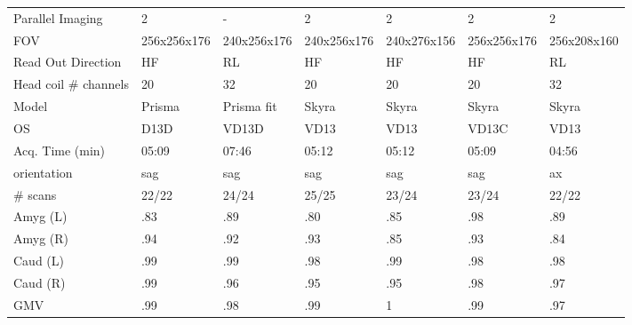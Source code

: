 \begin{table}
{\begin{tabular}{lllllll}
Parallel Imaging      &                    2 &                    - &                  2 &                   2 &                   2 &                   2 \\
FOV                   &          256x256x176 &          240x256x176 &        240x256x176 &         240x276x156 &         256x256x176 &         256x208x160 \\
Read Out Direction    &                   HF &                   RL &                 HF &                  HF &                  HF &                  RL \\
Head coil \# channels  &                   20 &                   32 &                 20 &                  20 &                  20 &                  32 \\
Model                 &               Prisma &           Prisma fit &              Skyra &               Skyra &               Skyra &               Skyra \\
OS                    &                 D13D &                VD13D &               VD13 &                VD13 &               VD13C &                VD13 \\
Acq. Time (min)       &             05:09 &             07:46 &           05:12 &            05:12 &            05:09 &            04:56 \\
orientation           &                  sag &                  sag &                sag &                 sag &                 sag &                  ax \\
\# scans & 22/22 & 24/24 & 25/25 & 23/24 & 23/24 &22/22 \\
\midrule
Amyg (L)              &                 .83 &                 .89 &               .80 &                .85 &                .98 &                .89 \\
Amyg (R)              &                 .94 &                 .92 &               .93 &                .85 &                .93 &                .84 \\
Caud (L)              &                 .99 &                 .99 &               .98 &                .99 &                .98 &                .98 \\
Caud (R)              &                 .99 &                 .96 &               .95 &                .95 &                .98 &                .97 \\
GMV                   &                 .99 &                 .98 &               .99 &                1   &                .99 &                .97 \\

\end{tabular}}
\end{table}

